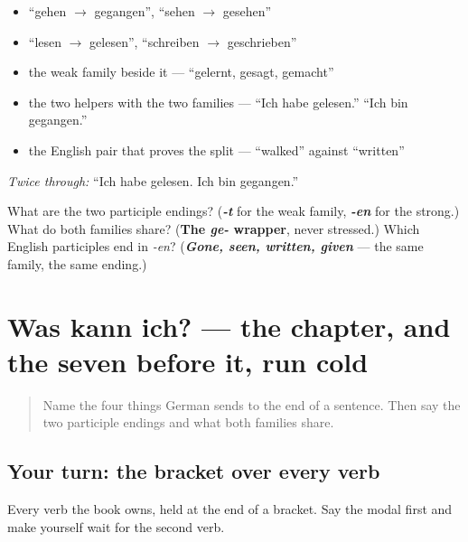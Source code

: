 \begin{itemize}
\raggedright
  \item \textquotedblleft{}gehen $\to$ gegangen\textquotedblright{}, \textquotedblleft{}sehen $\to$ gesehen\textquotedblright{}
  \item \textquotedblleft{}lesen $\to$ gelesen\textquotedblright{}, \textquotedblleft{}schreiben $\to$ geschrieben\textquotedblright{}
  \item the weak family beside it — \textquotedblleft{}gelernt, gesagt, gemacht\textquotedblright{}
  \item the two helpers with the two families — \textquotedblleft{}Ich habe gelesen.\textquotedblright{} \textquotedblleft{}Ich bin gegangen.\textquotedblright{}
  \item the English pair that proves the split — \textquotedblleft{}walked\textquotedblright{} against \textquotedblleft{}written\textquotedblright{}
\end{itemize}

\emph{Twice through:} \textquotedblleft{}Ich habe gelesen. Ich bin gegangen.\textquotedblright{}

\begin{tcolorbox}[breakable,colback=teal!4,colframe=teal!35!black,title={Before you move on}]
What are the two participle endings? (\emph{\textbf{-t}} for the weak family, \emph{\textbf{-en}} for the strong.) What do both families share? (\textbf{The \emph{ge-} wrapper}, never stressed.) Which English participles end in \emph{-en}? (\emph{\textbf{Gone, seen, written, given}} — the same family, the same ending.)
\end{tcolorbox}
\section[Practice]{Was kann ich? — the chapter, and the seven before it, run cold}

\label{lesson:GE-R38-was-kann-ich}



\begin{quote}
Name the four things German sends to the end of a sentence. Then say the two participle endings and what both families share.
\end{quote}

\subsection*{Your turn: the bracket over every verb}
Every verb the book owns, held at the end of a bracket. Say the modal first and make yourself wait for the second verb.

